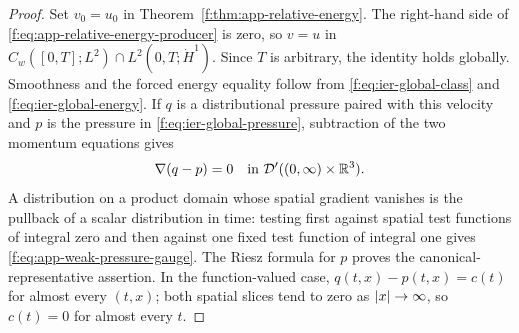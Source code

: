 \begin{proof}
Set \(v_0=u_0\) in Theorem~\ref{f:thm:app-relative-energy}.  The right-hand
side of \eqref{f:eq:app-relative-energy-producer} is zero, so
\(v=u\) in \(C_w([0,T];L^2)\cap L^2(0,T;\dot H^1)\).  Since \(T\) is
 arbitrary, the identity holds globally.  Smoothness and the forced energy equality
 follow from \eqref{f:eq:ier-global-class} and
 \eqref{f:eq:ier-global-energy}.  If \(q\) is a distributional pressure paired
 with this velocity and \(p\) is the pressure in
 \eqref{f:eq:ier-global-pressure}, subtraction of the two momentum equations
 gives
 \[
  \nabla(q-p)=0
  \quad\text{in }\mathcal D'((0,\infty)\times\mathbb R^3).
 \]
 A distribution on a product domain whose spatial gradient vanishes is the
 pullback of a scalar distribution in time: testing first against spatial test
 functions of integral zero and then against one fixed test function of
 integral one gives \eqref{f:eq:app-weak-pressure-gauge}.  The Riesz formula for
 \(p\) proves the canonical-representative assertion.  In the function-valued
 case, \(q(t,x)-p(t,x)=c(t)\) for almost every \((t,x)\); both spatial slices
 tend to zero as \(\left|x\right|\to\infty\), so \(c(t)=0\) for almost every \(t\).
\end{proof}
